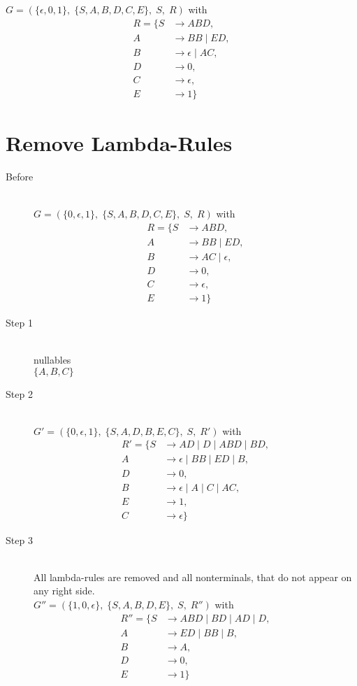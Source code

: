 \documentclass{article}
\begin{document}
$G=\left(\{\epsilon, 0, 1\},\;\{ S, A, B, D, C, E\},\;S,\;R\right)$ with
\begin{align*}
	R=\{	S &\rightarrow ABD, \\ 
	A &\rightarrow BB\;|\;ED, \\ 
	B &\rightarrow \epsilon\;|\;AC, \\ 
	D &\rightarrow 0, \\ 
	C &\rightarrow \epsilon, \\ 
	E &\rightarrow 1\}
\end{align*}
\section{Remove Lambda-Rules}

\begin{description}
	\item[Before] \hfill \\ 
		$G=\left(\{	0, \epsilon, 1\},\;\{ S, A, B, D, C, E\},\;S,\;R\right)$ with
	\begin{align*}
		R=\{	S &\rightarrow ABD, \\ 
		A &\rightarrow BB\;|\;ED, \\ 
		B &\rightarrow AC\;|\;\epsilon, \\ 
		D &\rightarrow 0, \\ 
		C &\rightarrow \epsilon, \\ 
		E &\rightarrow 1\}
	\end{align*}
	\item[Step 1] \hfill \\ 
	nullables\\ 
	$\{	A, 	B, 	C\}$
	\item[Step 2] \hfill \\ 
		$G'=\left(\{	0, \epsilon, 1\},\;\{ S, A, D, B, E, C\},\;S,\;R'\right)$ with
	\begin{align*}
		R'=\{	S &\rightarrow AD\;|\;D\;|\;ABD\;|\;BD, \\ 
		A &\rightarrow \epsilon\;|\;BB\;|\;ED\;|\;B, \\ 
		D &\rightarrow 0, \\ 
		B &\rightarrow \epsilon\;|\;A\;|\;C\;|\;AC, \\ 
		E &\rightarrow 1, \\ 
		C &\rightarrow \epsilon\}
	\end{align*}
	\item[Step 3] \hfill \\ 
	All lambda-rules are removed and all nonterminals, that do not appear on any right side.\\ 
	$G''=\left(\{	1, 0, \epsilon\},\;\{ S, A, B, D, E\},\;S,\;R''\right)$ with
	\begin{align*}
		R''=\{	S &\rightarrow ABD\;|\;BD\;|\;AD\;|\;D, \\ 
		A &\rightarrow ED\;|\;BB\;|\;B, \\ 
		B &\rightarrow A, \\ 
		D &\rightarrow 0, \\ 
		E &\rightarrow 1\}
	\end{align*}
\end{description}
\end{document}
